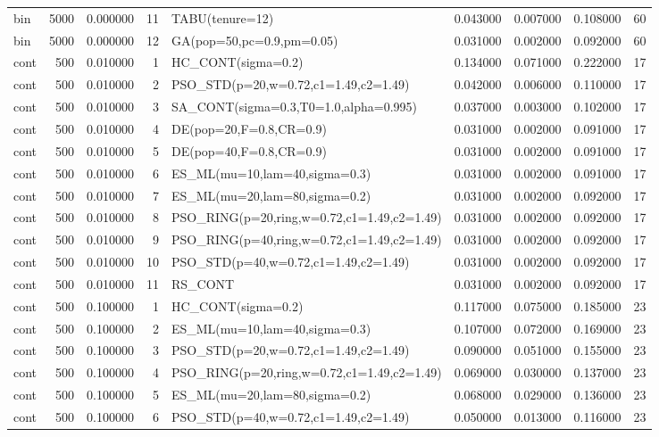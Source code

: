 \begin{longtable}{lrrrlrrrr}
bin & 5000 & 0.000000 & 11 & TABU(tenure=12) & 0.043000 & 0.007000 & 0.108000 & 60 \\
bin & 5000 & 0.000000 & 12 & GA(pop=50,pc=0.9,pm=0.05) & 0.031000 & 0.002000 & 0.092000 & 60 \\
cont & 500 & 0.010000 & 1 & HC\_CONT(sigma=0.2) & 0.134000 & 0.071000 & 0.222000 & 17 \\
cont & 500 & 0.010000 & 2 & PSO\_STD(p=20,w=0.72,c1=1.49,c2=1.49) & 0.042000 & 0.006000 & 0.110000 & 17 \\
cont & 500 & 0.010000 & 3 & SA\_CONT(sigma=0.3,T0=1.0,alpha=0.995) & 0.037000 & 0.003000 & 0.102000 & 17 \\
cont & 500 & 0.010000 & 4 & DE(pop=20,F=0.8,CR=0.9) & 0.031000 & 0.002000 & 0.091000 & 17 \\
cont & 500 & 0.010000 & 5 & DE(pop=40,F=0.8,CR=0.9) & 0.031000 & 0.002000 & 0.091000 & 17 \\
cont & 500 & 0.010000 & 6 & ES\_ML(mu=10,lam=40,sigma=0.3) & 0.031000 & 0.002000 & 0.091000 & 17 \\
cont & 500 & 0.010000 & 7 & ES\_ML(mu=20,lam=80,sigma=0.2) & 0.031000 & 0.002000 & 0.092000 & 17 \\
cont & 500 & 0.010000 & 8 & PSO\_RING(p=20,ring,w=0.72,c1=1.49,c2=1.49) & 0.031000 & 0.002000 & 0.092000 & 17 \\
cont & 500 & 0.010000 & 9 & PSO\_RING(p=40,ring,w=0.72,c1=1.49,c2=1.49) & 0.031000 & 0.002000 & 0.092000 & 17 \\
cont & 500 & 0.010000 & 10 & PSO\_STD(p=40,w=0.72,c1=1.49,c2=1.49) & 0.031000 & 0.002000 & 0.092000 & 17 \\
cont & 500 & 0.010000 & 11 & RS\_CONT & 0.031000 & 0.002000 & 0.092000 & 17 \\
cont & 500 & 0.100000 & 1 & HC\_CONT(sigma=0.2) & 0.117000 & 0.075000 & 0.185000 & 23 \\
cont & 500 & 0.100000 & 2 & ES\_ML(mu=10,lam=40,sigma=0.3) & 0.107000 & 0.072000 & 0.169000 & 23 \\
cont & 500 & 0.100000 & 3 & PSO\_STD(p=20,w=0.72,c1=1.49,c2=1.49) & 0.090000 & 0.051000 & 0.155000 & 23 \\
cont & 500 & 0.100000 & 4 & PSO\_RING(p=20,ring,w=0.72,c1=1.49,c2=1.49) & 0.069000 & 0.030000 & 0.137000 & 23 \\
cont & 500 & 0.100000 & 5 & ES\_ML(mu=20,lam=80,sigma=0.2) & 0.068000 & 0.029000 & 0.136000 & 23 \\
cont & 500 & 0.100000 & 6 & PSO\_STD(p=40,w=0.72,c1=1.49,c2=1.49) & 0.050000 & 0.013000 & 0.116000 & 23 \\

\end{longtable}

